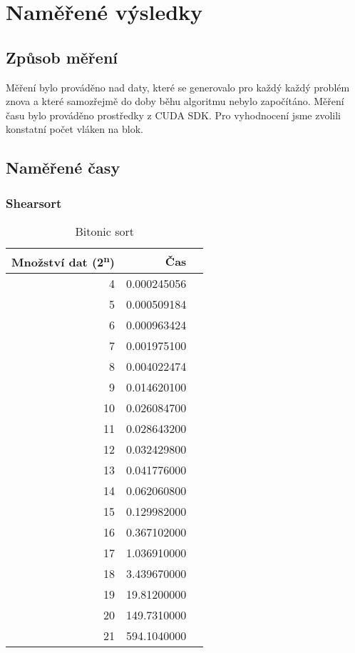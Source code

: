 \documentclass[12pt]{article}
\begin{document}
\section{Naměřené výsledky}
\subsection{Způsob měření}
Měření bylo prováděno nad daty, které se generovalo pro každý každý problém znova a které samozřejmě do doby běhu algoritmu nebylo započítáno. Měření času bylo prováděno prostředky z CUDA SDK. Pro vyhodnocení jsme zvolili konstatní počet vláken na blok.

\subsection{Naměřené časy}
\subsubsection{Shearsort}
\begin{table}[H]
\begin{center}
\begin{tabular}{|r|r|r|}
\hline Množství dat (2\textsuperscript{n}) & Čas \\ \hline
4       &  0.000245056 \\ \hline
5       &  0.000509184 \\ \hline
6       &  0.000963424 \\ \hline
7       &  0.001975100 \\ \hline
8       &  0.004022474 \\ \hline
9       &  0.014620100 \\ \hline
10      &  0.026084700 \\ \hline
11      &  0.028643200 \\ \hline
12      &  0.032429800 \\ \hline
13      &  0.041776000 \\ \hline
14      &  0.062060800 \\ \hline
15      &  0.129982000 \\ \hline
16      &  0.367102000 \\ \hline
17      &  1.036910000 \\ \hline
18      &  3.439670000 \\ \hline
19      &  19.81200000 \\ \hline
20      &  149.7310000 \\ \hline
21      &  594.1040000 \\ \hline
\end{tabular} 
\end{center}
\caption{Bitonic sort}
\end{table} 
\end{document}
